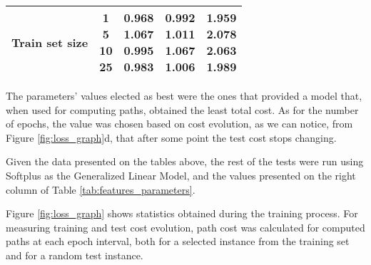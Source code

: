 \begin{table}[!ht]
\begin{tabular}{|c|c|c|c|c|}
        \hline
        Train set size & \makecell{\textbf{1} \\ 5 \\ 10 \\ 25} & \makecell{\textbf{0.968} \\ 1.067 \\ 0.995 \\ 0.983} & \makecell{\textbf{0.992} \\ 1.011 \\ 1.067 \\ 1.006} & \makecell{\textbf{1.959} \\ 2.078 \\ 2.063 \\ 1.989}\\
        \hline
    \end{tabular}
    \label{tab:params}
\end{table}

The parameters' values elected as best were the ones that provided a model that, when used for computing paths, obtained the least total cost. As for the number of epochs, the value was chosen based on cost evolution, as we can notice, from Figure \ref{fig:loss_graph}d, that after some point the test cost stops changing.

Given the data presented on the tables above, the rest of the tests were run using Softplus as the Generalized Linear Model, and the values presented on the right column of Table \ref{tab:features_parameters}.

Figure \ref{fig:loss_graph} shows statistics obtained during the training process. For measuring training and test cost evolution, path cost was calculated for computed paths at each epoch interval, both for a selected instance from the training set and for a random test instance.


